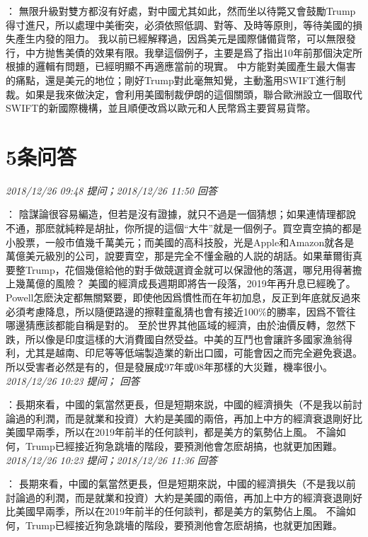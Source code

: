 \documentclass[twocolumn]{ctexart}
\begin{document}
：
無限升級對雙方都沒有好處，對中國尤其如此，然而坐以待斃又會鼓勵Trump得寸進尺，所以處理中美衝突，必須依照低調、對等、及時等原則，等待美國的損失產生内發的阻力。
我以前已經解釋過，因爲美元是國際儲備貨幣，可以無限發行，中方抛售美債的效果有限。我擧這個例子，主要是爲了指出10年前那個決定所根據的邏輯有問題，已經明顯不再適應當前的現實。
中方能對美國產生最大傷害的痛點，還是美元的地位；剛好Trump對此毫無知覺，主動濫用SWIFT進行制裁。如果是我來做決定，會利用美國制裁伊朗的這個關頭，聯合歐洲設立一個取代SWIFT的新國際機構，並且順便改爲以歐元和人民幣爲主要貿易貨幣。
\\

\section{5条问答}

\textit{\hfill\noindent\small 2018/12/26 09:48 提问；2018/12/26 11:50 回答}

：
陰謀論很容易編造，但若是沒有證據，就只不過是一個猜想；如果連情理都說不通，那麽就純粹是胡扯，你所提的這個“大牛”就是一個例子。買空賣空搞的都是小股票，一般市值幾千萬美元；而美國的高科技股，光是Apple和Amazon就各是萬億美元級別的公司，說要賣空，那是完全不懂金融的人説的胡話。如果華爾街真要整Trump，花個幾億給他的對手做競選資金就可以保證他的落選，哪兒用得著擔上幾萬億的風險？ 
美國的經濟成長週期即將告一段落，2019年再升息已經晚了。 Powell怎麽決定都無關緊要，即使他因爲慣性而在年初加息，反正到年底就反過來必須考慮降息，所以隨便路邊的擦鞋童亂猜也會有接近100\%的勝率，因爲不管往哪邊猜應該都能自稱是對的。 
至於世界其他區域的經濟，由於油價反轉，忽然下跌，所以像是印度這樣的大消費國自然受益。中美的互鬥也會讓許多國家漁翁得利，尤其是越南、印尼等等低端製造業的新出口國，可能會因之而完全避免衰退。所以受害者必然是有的，但是發展成97年或08年那樣的大災難，機率很小。
\\

\textit{\hfill\noindent\small 2018/12/26 10:23 提问； 回答}

：長期來看，中國的氣當然更長，但是短期來説，中國的經濟損失（不是我以前討論過的利潤，而是就業和投資）大約是美國的兩倍，再加上中方的經濟衰退剛好比美國早兩季，所以在2019年前半的任何談判，都是美方的氣勢佔上風。 不論如何，Trump已經接近狗急跳墻的階段，要預測他會怎麽胡搞，也就更加困難。\\

\textit{\hfill\noindent\small 2018/12/26 10:23 提问；2018/12/26 11:36 回答}

：
長期來看，中國的氣當然更長，但是短期來説，中國的經濟損失（不是我以前討論過的利潤，而是就業和投資）大約是美國的兩倍，再加上中方的經濟衰退剛好比美國早兩季，所以在2019年前半的任何談判，都是美方的氣勢佔上風。 
不論如何，Trump已經接近狗急跳墻的階段，要預測他會怎麽胡搞，也就更加困難。
\\
\end{document}
